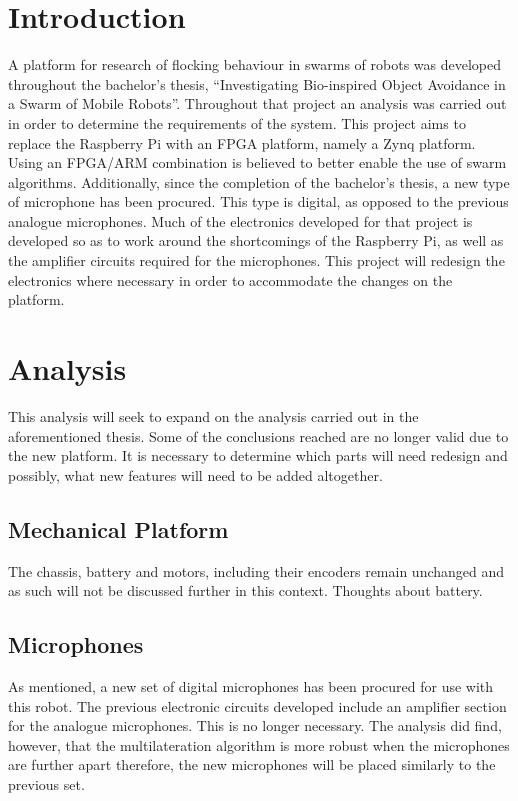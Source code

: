 
\section{Introduction}
A platform for research of flocking behaviour in swarms of robots was developed throughout the bachelor's thesis, ``Investigating Bio-inspired Object Avoidance in a Swarm of Mobile Robots''.
Throughout that project an analysis was carried out in order to determine the requirements of the system.
This project aims to replace the Raspberry Pi with an FPGA platform, namely a Zynq platform.
Using an FPGA/ARM combination is believed to better enable the use of swarm algorithms.
Additionally, since the completion of the bachelor's thesis, a new type of microphone has been procured.
This type is digital, as opposed to the previous analogue microphones.
Much of the electronics developed for that project is developed so as to work around the shortcomings of the Raspberry Pi, as well as the amplifier circuits required for the microphones.
This project will redesign the electronics where necessary in order to accommodate the changes on the platform.

\section{Analysis} %
\label{sec:analysis}
This analysis will seek to expand on the analysis carried out in the aforementioned thesis.
Some of the conclusions reached are no longer valid due to the new platform.
It is necessary to determine which parts will need redesign and possibly, what new features will need to be added altogether.

\subsection{Mechanical Platform} %
\label{sub:mechanical_platform}
The chassis, battery and motors, including their encoders remain unchanged and as such will not be discussed further in this context.
Thoughts about battery.

\subsection{Microphones} %
\label{sub:microphones}
As mentioned, a new set of digital microphones has been procured for use with this robot.
The previous electronic circuits developed include an amplifier section for the analogue microphones.
This is no longer necessary.
The analysis did find, however, that the multilateration algorithm is more robust when the microphones are further apart therefore, the new microphones will be placed similarly to the previous set.

